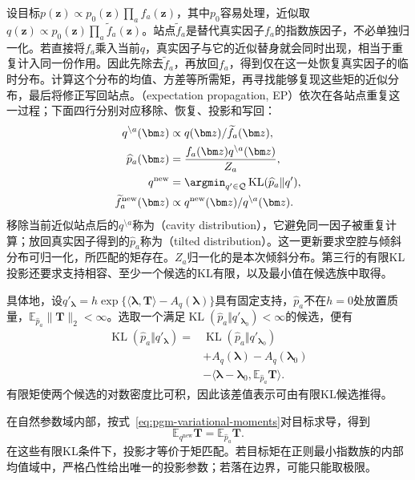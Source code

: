 设目标$p(\bm z)\propto p_0(\bm z)\prod_a f_a(\bm z)$，其中$p_0$容易处理，近似取$q(\bm z)\propto p_0(\bm z)\prod_a\widetilde f_a(\bm z)$。站点$\widetilde f_a$是替代真实因子$f_a$的指数族因子，不必单独归一化。若直接将$f_a$乘入当前$q$，真实因子与它的近似替身就会同时出现，相当于重复计入同一份作用。因此先除去$\widetilde f_a$，再放回$f_a$，得到仅在这一处恢复真实因子的临时分布。计算这个分布的均值、方差等所需矩，再寻找能够复现这些矩的近似分布，最后将修正写回站点。（expectation propagation, EP）依次在各站点重复这一过程；下面四行分别对应移除、恢复、投影和写回：
\begin{equation}
  \begin{aligned}
    q^{\setminus a}(\bm z)&\propto q(\bm z)/\widetilde f_a(\bm z),\\
    \widehat p_a(\bm z)&=
       \frac{f_a(\bm z)q^{\setminus a}(\bm z)}{Z_a},\\
    q^{\mathrm{new}}&=
       \argmin_{q'\in\mathcal Q}
           \operatorname{KL}(\widehat p_a\Vert q'),\\
    \widetilde f_a^{\mathrm{new}}(\bm z)&\propto
       q^{\mathrm{new}}(\bm z)/q^{\setminus a}(\bm z).
  \end{aligned}
  \label{eq:pgm-variational-ep}
\end{equation}
移除当前近似站点后的$q^{\setminus a}$称为（cavity distribution），它避免同一因子被重复计算；放回真实因子得到的$\widehat p_a$称为（tilted distribution）。这一更新要求空腔与倾斜分布可归一化，所匹配的矩存在。$Z_a$归一化的是本次倾斜分布。第三行的有限KL投影还要求支持相容、至少一个候选的KL有限，以及最小值在候选族中取得。

具体地，设$q'_{\bm{\lambda}}=h\exp\{\langle\bm{\lambda},\bm T\rangle-A_q(\bm{\lambda})\}$具有固定支持，$\widehat p_a$不在$h=0$处放置质量，$\mathbb E_{\widehat p_a}\lVert\bm T\rVert_2<\infty$。选取一个满足$\operatorname{KL}(\widehat p_a\Vert q'_{\bm{\lambda}_0})<\infty$的候选，便有
\[
  \begin{aligned}
    \operatorname{KL}(\widehat p_a\Vert q'_{\bm{\lambda}})
      ={}&\operatorname{KL}(\widehat p_a\Vert q'_{\bm{\lambda}_0})\\
       &+A_q(\bm{\lambda})-A_q(\bm{\lambda}_0)\\
       &-\langle\bm{\lambda}-\bm{\lambda}_0,
                  \mathbb E_{\widehat p_a}\bm T\rangle.
  \end{aligned}
\]
有限矩使两个候选的对数密度比可积，因此该差值表示可由有限KL候选推得。

在自然参数域内部，按式~\eqref{eq:pgm-variational-moments}对目标求导，得到
\begin{equation}
  \mathbb E_{q^{\mathrm{new}}}\bm T
     =\mathbb E_{\widehat p_a}\bm T.
  \label{eq:pgm-variational-moment-matching}
\end{equation}
在这些有限KL条件下，投影才等价于矩匹配。若目标矩在正则最小指数族的内部均值域中，严格凸性给出唯一的投影参数；若落在边界，可能只能取极限。

